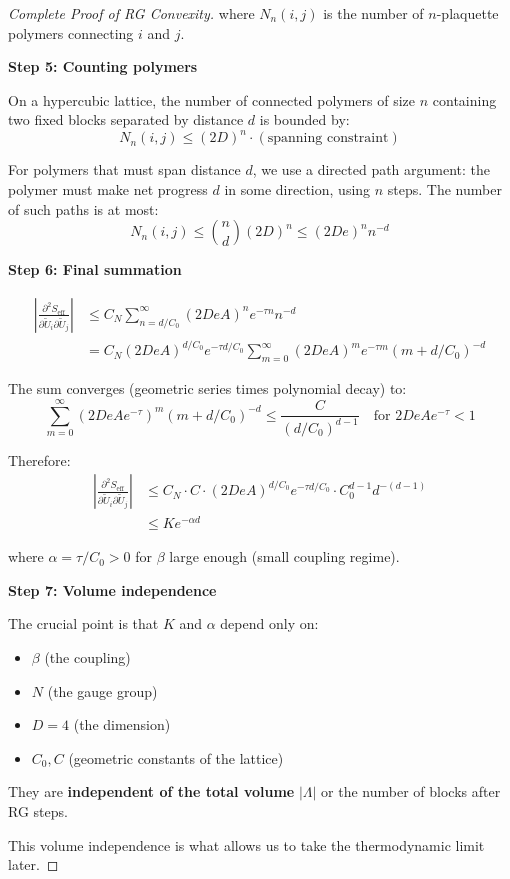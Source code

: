 \begin{proof}[Complete Proof of RG Convexity]
where $N_n(i,j)$ is the number of $n$-plaquette polymers connecting $i$ and $j$.

\textbf{Step 5: Counting polymers}

On a hypercubic lattice, the number of connected polymers of size $n$ containing two fixed blocks separated by distance $d$ is bounded by:
\begin{equation}
N_n(i,j) \le (2D)^n \cdot (\text{spanning constraint})
\end{equation}

For polymers that must span distance $d$, we use a directed path argument: the polymer must make net progress $d$ in some direction, using $n$ steps. The number of such paths is at most:
\begin{equation}
N_n(i,j) \le \binom{n}{d} (2D)^n \le (2De)^n n^{-d}
\end{equation}

\textbf{Step 6: Final summation}

\begin{align}
\left| \frac{\partial^2 S_{\text{eff}}}{\partial \widetilde{U}_i \partial \widetilde{U}_j} \right| &\le C_N \sum_{n=d/C_0}^\infty (2DeA)^n e^{-\tau n} n^{-d} \\
&= C_N (2DeA)^{d/C_0} e^{-\tau d/C_0} \sum_{m=0}^\infty (2DeA)^m e^{-\tau m} (m + d/C_0)^{-d}
\end{align}

The sum converges (geometric series times polynomial decay) to:
\begin{equation}
\sum_{m=0}^\infty (2DeA e^{-\tau})^m (m + d/C_0)^{-d} \le \frac{C}{(d/C_0)^{d-1}} \quad \text{for } 2DeA e^{-\tau} < 1
\end{equation}

Therefore:
\begin{align}
\left| \frac{\partial^2 S_{\text{eff}}}{\partial \widetilde{U}_i \partial \widetilde{U}_j} \right| &\le C_N \cdot C \cdot (2DeA)^{d/C_0} e^{-\tau d/C_0} \cdot C_0^{d-1} d^{-(d-1)} \\
&\le K e^{-\alpha d}
\end{align}

where $\alpha = \tau/C_0 > 0$ for $\beta$ large enough (small coupling regime).

\textbf{Step 7: Volume independence}

The crucial point is that $K$ and $\alpha$ depend only on:
\begin{itemize}
\item $\beta$ (the coupling)
\item $N$ (the gauge group)
\item $D = 4$ (the dimension)
\item $C_0, C$ (geometric constants of the lattice)
\end{itemize}

They are \textbf{independent of the total volume} $|\Lambda|$ or the number of blocks after RG steps.

This volume independence is what allows us to take the thermodynamic limit later.
\end{proof}

